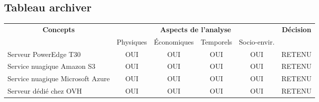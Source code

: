 

\subsection{Tableau archiver}
\label{s:archiver_tableau}

\begin{table}[]
	\begin{tabular}{|l|c|c|c|c|c|}
		\hline
		\multicolumn{1}{|c|}{\multirow{2}{*}{\textbf{Concepts}}} & \multicolumn{4}{c|}{\textbf{Aspects de l'analyse}} & \multirow{2}{*}{\textbf{Décision}} \\ \cline{2-5}
		\multicolumn{1}{|c|}{}                                   & Physiques & Économiques & Temporels & Socio-envir. &                                    \\ \hline
		Serveur PowerEdge T30                                                 & OUI       & OUI         & OUI       & OUI          & RETENU                             \\ \hline
		Service nuagique Amazon S3                                                 & OUI       & OUI         & OUI       & OUI          & RETENU                             \\ \hline
		Service nuagique Microsoft Azure                                                 & OUI       & OUI         & OUI       & OUI          & RETENU                             \\ \hline
		Serveur dédié chez OVH                                                & OUI       & OUI         & OUI       & OUI          & RETENU	        \\ \hline
	\end{tabular}
\end{table}